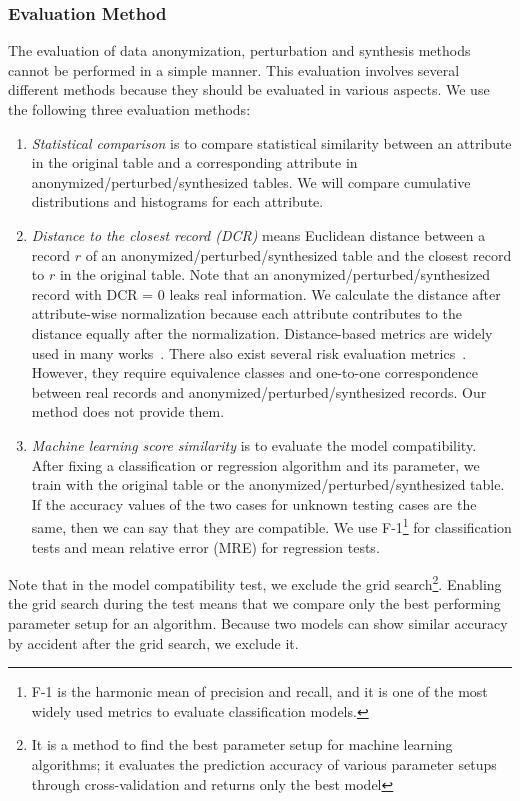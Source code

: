 \subsubsection{Evaluation Method} The evaluation of data anonymization, perturbation and synthesis methods cannot be performed in a simple manner. This evaluation involves several different methods because they should be evaluated in various aspects. We use the following three evaluation methods:

\begin{enumerate}
\item \textit{Statistical comparison} is to compare statistical similarity between an attribute in the original table and a corresponding attribute in anonymized\slash perturbed\slash synthesized tables. We will compare cumulative distributions and histograms for each attribute.
\item \textit{Distance to the closest record (DCR)} means Euclidean distance between a record $r$ of an anonymized\slash perturbed\slash synthesized table and the closest record to $r$ in the original table. Note that an anonymized\slash perturbed\slash synthesized record with DCR = 0 leaks real information. We calculate the distance after attribute-wise normalization because each attribute contributes to the distance equally after the normalization. Distance-based metrics are widely used in many works~\cite{Mateo-Sanz2004}. There also exist several risk evaluation metrics~\cite{Domingo-ferrer01comparingsdc,Mateo-Sanz04outlierprotection}. However, they require equivalence classes and one-to-one correspondence between real records and anonymized\slash perturbed\slash synthesized records. Our method does not provide them.
\item \textit{Machine learning score similarity} is to evaluate the model compatibility. After fixing a classification or regression algorithm and its parameter, we train with the original table or the anonymized\slash perturbed\slash synthesized table. If the accuracy values of the two cases for unknown testing cases are the same, then we can say that they are compatible. We use F-1\footnote{F-1 is the harmonic mean of precision and recall, and it is one of the most widely used metrics to evaluate classification models.} for classification tests and mean relative error (MRE) for regression tests.
\end{enumerate}

Note that in the model compatibility test, we exclude the grid search\footnote{It is a method to find the best parameter setup for machine learning algorithms; it evaluates the prediction accuracy of various parameter setups through cross-validation and returns only the best model}. Enabling the grid search during the test means that we compare only the best performing parameter setup for an algorithm. Because two models can show similar accuracy by accident after the grid search, we exclude it.

